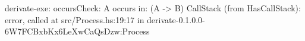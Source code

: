 derivate-exe: occursCheck: A occurs in: (A -> B)
CallStack (from HasCallStack):
  error, called at src/Process.hs:19:17 in derivate-0.1.0.0-6W7FCBxbKx6LeXwCaQsDzw:Process
